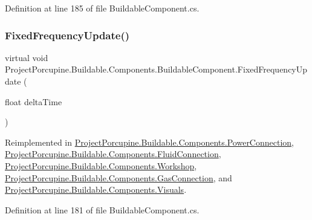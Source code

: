 Definition at line 185 of file Buildable\+Component.\+cs.

\mbox{\label{class_project_porcupine_1_1_buildable_1_1_components_1_1_buildable_component_a0528e50f3dbe24481256802e758deeb9}} 
\subsubsection{\texorpdfstring{Fixed\+Frequency\+Update()}{FixedFrequencyUpdate()}}
{\footnotesize\ttfamily virtual void Project\+Porcupine.\+Buildable.\+Components.\+Buildable\+Component.\+Fixed\+Frequency\+Update (\begin{DoxyParamCaption}\item[{float}]{delta\+Time }\end{DoxyParamCaption})\hspace{0.3cm}{\ttfamily [virtual]}}



Reimplemented in \hyperlink{class_project_porcupine_1_1_buildable_1_1_components_1_1_power_connection_a1e7dcf30f17d4169978a2bf31a31b50c}{Project\+Porcupine.\+Buildable.\+Components.\+Power\+Connection}, \hyperlink{class_project_porcupine_1_1_buildable_1_1_components_1_1_fluid_connection_aa61596b6b7cb20b8ef6c0672fa3f3119}{Project\+Porcupine.\+Buildable.\+Components.\+Fluid\+Connection}, \hyperlink{class_project_porcupine_1_1_buildable_1_1_components_1_1_workshop_adaf70643c87224e88a4efe3cc45ec288}{Project\+Porcupine.\+Buildable.\+Components.\+Workshop}, \hyperlink{class_project_porcupine_1_1_buildable_1_1_components_1_1_gas_connection_a999f07a477a5d042ae0b53ede65b34dd}{Project\+Porcupine.\+Buildable.\+Components.\+Gas\+Connection}, and \hyperlink{class_project_porcupine_1_1_buildable_1_1_components_1_1_visuals_a3650e3d2ff6aef61090eeaf900f9a041}{Project\+Porcupine.\+Buildable.\+Components.\+Visuals}.



Definition at line 181 of file Buildable\+Component.\+cs.

